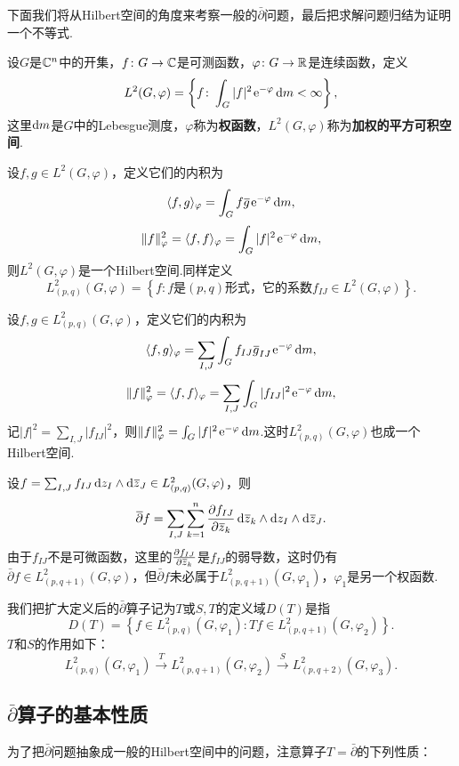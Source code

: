 下面我们将从Hilbert空间的角度来考察一般的$\bar{\partial}$问题，最后把求解问题归结为证明一个不等式.
\begin{definition}\label{def6.2.1}
	设$G$是$\mathbb C^n$中的开集，$f\colon G\to\mathbb C$是可测函数，$\varphi\colon G\to\mathbb R$是连续函数，定义
	\[L^2(G,\varphi)=\left\{f\colon\int_G |f|^2\operatorname{\!\!\;\mathrm e}^{-\varphi}\mathop{}\!\mathrm{d} m<\infty\right\},\]
	这里$\mathop{}\!\mathrm{d} m$是$G$中的Lebesgue测度，$\varphi$称为\textbf{权函数}，$L^2(G,\varphi)$称为\textbf{加权的平方可积空间}.
\end{definition}
设$f,g\in L^2(G,\varphi)$，定义它们的内积为
\[\langle f,g\rangle_\varphi=\int_G f{}\mkern1mu\overline{\mkern-1mug}\operatorname{\!\!\;\mathrm e}^{-\varphi}\mathop{}\!\mathrm{d} m,\]
\[\Vert f\Vert_\varphi^2=\langle f,f\rangle_\varphi=\int_G |f|^2\operatorname{\!\!\;\mathrm e}^{-\varphi}\mathop{}\!\mathrm{d} m,\]
则$L^2(G,\varphi)$是一个Hilbert空间.同样定义
\[L_{(p,q)}^2(G,\varphi)=\left\{f\colon\text{$f$是$(p,q)$形式，它的系数$f_{IJ}\in L^2(G,\varphi)$}\right\}.\]

设$f,g\in L_{(p,q)}^2(G,\varphi)$，定义它们的内积为
\[\langle f,g\rangle_\varphi=\sum_{I,J}\int_G f_{IJ}{}\mkern1mu\overline{\mkern-1mug}_{IJ}\operatorname{\!\!\;\mathrm e}^{-\varphi}\mathop{}\!\mathrm{d} m,\]
\[\Vert f\Vert_\varphi^2=\langle f,f\rangle_\varphi=\sum_{I,J}\int_G |f_{IJ}|^2\operatorname{\!\!\;\mathrm e}^{-\varphi}\mathop{}\!\mathrm{d} m,\]
记$|f|^2=\sum_{I,J}|f_{IJ}|^2$，则$\Vert f\Vert_\varphi^2=\int_G |f|^2\operatorname{\!\!\;\mathrm e}^{-\varphi}\mathop{}\!\mathrm{d} m$.这时$L_{(p,q)}^2(G,\varphi)$也成一个Hilbert空间.

设$f=\sum_{I,J}f_{IJ}\mathop{}\!\mathrm dz_I\wedge\mathop{}\!\mathrm d{}\mkern1mu\overline{\mkern-1muz}_J\in L_{(p,q)}^2(G,\varphi)$，则
\[{}\mkern1mu\overline{\mkern-1mu\partial}f=\sum_{I,J}\sum_{k=1}^{n}\frac{\partial f_{IJ}}{\partial {}\mkern1mu\overline{\mkern-1muz}_k}\mathop{}\!\mathrm d{}\mkern1mu\overline{\mkern-1muz}_k\wedge\mathop{}\!\mathrm dz_I\wedge\mathop{}\!\mathrm d{}\mkern1mu\overline{\mkern-1muz}_J.\]
由于$f_{IJ}$不是可微函数，这里的$\frac{\partial f_{IJ}}{\partial {}\mkern1mu\overline{\mkern-1muz}_k}$是$f_{IJ}$的弱导数，这时仍有$\bar{\partial}f\in L_{(p,q+1)}^2(G,\varphi)$，但$\bar{\partial}f$未必属于$L_{(p,q+1)}^2(G,\varphi_1)$，$\varphi_1$是另一个权函数.

我们把扩大定义后的$\bar{\partial}$算子记为$T$或$S,T$的定义域$D(T)$是指
\[D(T)=\left\{f\in L_{(p,q)}^2(G,\varphi_1)\colon Tf\in L_{(p,q+1)}^2(G,\varphi_2)\right\}.\]
$T$和$S$的作用如下：
\[L_{(p,q)}^2(G,\varphi_1) \overset{T}{\longrightarrow} L_{(p,q+1)}^2(G,\varphi_2)\overset{S}{\longrightarrow} L_{(p,q+2)}^2(G,\varphi_3).\]
\subsection{$\bar{\partial}$算子的基本性质}
为了把$\bar{\partial}$问题抽象成一般的Hilbert空间中的问题，注意算子$T=\bar{\partial}$的下列性质：

